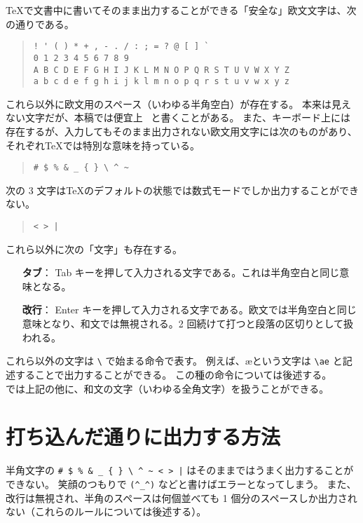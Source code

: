 \TeX{}で文書中に書いてそのまま出力することができる「安全な」欧文文字は、次の通りである。
\begin{quote}
\begin{verbatim}
! ' ( ) * + , - . / : ; = ? @ [ ] `
0 1 2 3 4 5 6 7 8 9
A B C D E F G H I J K L M N O P Q R S T U V W X Y Z
a b c d e f g h i j k l m n o p q r s t u v w x y z
\end{verbatim}
\end{quote}
これら以外に欧文用のスペース（いわゆる半角空白）が存在する。
本来は見えない文字だが、本稿では便宜上 \textvisiblespace\ と書くことがある。
また、キーボード上には存在するが、入力してもそのまま出力されない欧文用文字には次のものがあり、それぞれ\TeX{}では特別な意味を持っている。
\begin{quote}
\begin{verbatim}
# $ % & _ { } \ ^ ~
\end{verbatim}
\end{quote}
次の 3 文字は\TeX{}のデフォルトの状態では数式モードでしか出力することができない。
\begin{quote}
\begin{verbatim}
< > |
\end{verbatim}
\end{quote}
これら以外に次の「文字」も存在する。
\begin{itemize}\setlength{\leftskip}{+1.00zw}\setlength{\labelsep}{+0.40zw}
\item[\textbf{タブ}：] Tab キーを押して入力される文字である。これは半角空白と同じ意味となる。
\item[\textbf{改行}：] Enter キーを押して入力される文字である。欧文では半角空白と同じ意味となり、和文では無視される。2 回続けて打つと段落の区切りとして扱われる。
\end{itemize}
これら以外の文字は \verb'\' で始まる命令で表す。
例えば、\ae という文字は \verb'\ae' と記述することで出力することができる。
この種の命令については後述する。\\

\pTeX{}では上記の他に、和文の文字（いわゆる全角文字）を扱うことができる。
\section{打ち込んだ通りに出力する方法}
半角文字の \verb'# $ % & _ { } \ ^ ~ < > |' はそのままではうまく出力することができない。
笑顔のつもりで \verb'(^_^)' などと書けばエラーとなってしまう。
また、改行は無視され、半角のスペースは何個並べても 1 個分のスペースしか出力されない（これらのルールについては後述する）。\\

